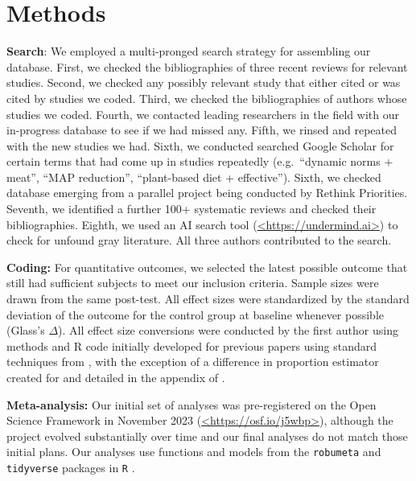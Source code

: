 \documentclass[sn-nature,pdflatex]{sn-jnl}
\begin{document}
\section{Methods}\label{sec3}

\textbf{Search}: We employed a multi-pronged search strategy for
assembling our database. First, we checked the bibliographies of three
recent reviews
\citep{mathur2021meta, bianchi2018conscious, bianchi2018restructuring}
for relevant studies. Second, we checked any possibly relevant study
that either cited or was cited by studies we coded. Third, we checked
the bibliographies of authors whose studies we coded. Fourth, we
contacted leading researchers in the field with our in-progress database
to see if we had missed any. Fifth, we rinsed and repeated with the new
studies we had. Sixth, we conducted searched Google Scholar for certain
terms that had come up in studies repeatedly (e.g.~``dynamic norms +
meat'', ``MAP reduction'', ``plant-based diet + effective''). Sixth, we
checked database emerging from a parallel project being conducted by
Rethink Priorities. Seventh, we identified a further 100+ systematic
reviews and checked their bibliographies. Eighth, we used an AI search
tool (\url{<https://undermind.ai>}) to check for unfound gray
literature. All three authors contributed to the search.

\textbf{Coding:} For quantitative outcomes, we selected the latest
possible outcome that still had sufficient subjects to meet our
inclusion criteria. Sample sizes were drawn from the same post-test. All
effect sizes were standardized by the standard deviation of the outcome
for the control group at baseline whenever possible (Glass's
\(\Delta\)). All effect size conversions were conducted by the first
author using methods and R code initially developed for previous papers
\citep{paluck2019, paluck2021, porat2024} using standard techniques from
\citep{cooper2019}, with the exception of a difference in proportion
estimator created for \citep{paluck2021} and detailed in the appendix of
\citep{porat2024}.

\textbf{Meta-analysis:} Our initial set of analyses was pre-registered
on the Open Science Framework in November 2023
(\url{<https://osf.io/j5wbp>}), although the project evolved
substantially over time and our final analyses do not match those
initial plans. Our analyses use functions and models from the
\texttt{robumeta} \citep{fisher2015} and \texttt{tidyverse}
\citep{wickham2019} packages in \texttt{R} \citep{Rlang}.
\end{document}
